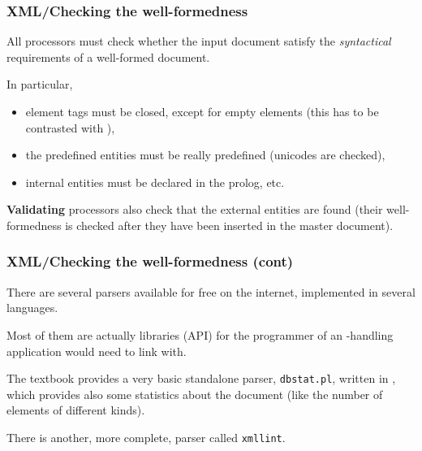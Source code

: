 %
\begin{frame}
\frametitle{XML/Checking the well-formedness}
\label{well_formedness}

All \XML processors must check whether the input document satisfy the
\emph{syntactical} requirements of a well-formed \XML document.

\bigskip

In particular,
\begin{itemize}

  \item element tags must be closed, except for empty elements (this
    has to be contrasted with \HTML),

  \item the predefined entities must be really predefined (unicodes
    are checked),

  \item internal entities must be declared in the prolog, etc.

\end{itemize}
\textbf{Validating} processors also check that the external entities
are found (their well-formedness is checked after they have been
inserted in the master document).

\end{frame}

%
\begin{frame}
\frametitle{XML/Checking the well-formedness (cont)}

There are several \XML parsers available for free on the internet,
implemented in several languages. 

\bigskip

Most of them are actually libraries (API) for the programmer of an
\XML-handling application would need to link with.

\bigskip

The textbook provides a very basic standalone parser,
\texttt{dbstat.pl}, written in \Perl, which provides also some
statistics about the document (like the number of elements of
different kinds).

\bigskip

There is another, more complete, parser called \texttt{xmllint}.

\end{frame}
